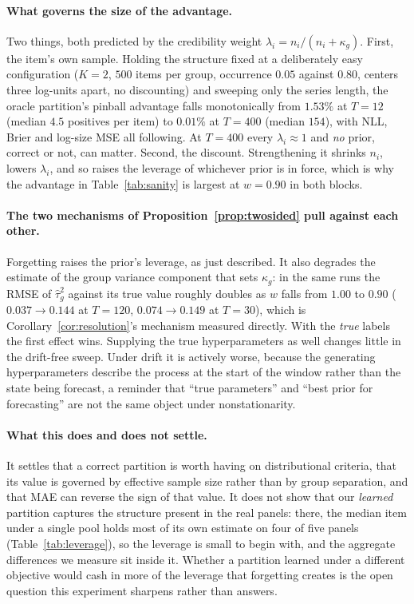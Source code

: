 \documentclass[twocolumn,10pt]{article}
\begin{document}
\paragraph{What governs the size of the advantage.} Two things, both
predicted by the credibility weight $\lambda_i=n_i/(n_i+\kappa_g)$.
First, the item's own sample. Holding the structure fixed at a
deliberately easy configuration ($K{=}2$, $500$ items per group,
occurrence $0.05$ against $0.80$, centers three log-units apart, no
discounting) and sweeping only the series length, the oracle partition's
pinball advantage falls monotonically from $1.53\%$ at $T{=}12$ (median
$4.5$ positives per item) to $0.01\%$ at $T{=}400$ (median $154$), with
NLL, Brier and log-size MSE all following. At $T{=}400$ every
$\lambda_i\approx1$ and \emph{no} prior, correct or not, can matter.
Second, the discount. Strengthening it shrinks $n_i$, lowers
$\lambda_i$, and so raises the leverage of whichever prior is in
force, which is why the advantage in Table~\ref{tab:sanity} is largest
at $w{=}0.90$ in both blocks.

\paragraph{The two mechanisms of Proposition~\ref{prop:twosided} pull
against each other.} Forgetting raises the prior's leverage, as just
described. It also degrades the estimate of the group variance component
that sets $\kappa_g$: in the same runs the RMSE of $\hat\tau_g^2$ against
its true value roughly doubles as $w$ falls from $1.00$ to $0.90$
($0.037\to0.144$ at $T{=}120$, $0.074\to0.149$ at $T{=}30$), which is
Corollary~\ref{cor:resolution}'s mechanism measured directly. With the
\emph{true} labels the first effect wins. Supplying the true
hyperparameters as well changes little in the drift-free sweep. Under
drift it is actively worse, because the generating hyperparameters
describe the process at the start of the window rather than the state
being forecast, a reminder that ``true parameters'' and ``best prior
for forecasting'' are not the same object under nonstationarity.

\paragraph{What this does and does not settle.} It settles that a correct
partition is worth having on distributional criteria, that its value is
governed by effective sample size rather than by group separation, and
that MAE can reverse the sign of that value. It does not show that our
\emph{learned} partition captures the structure present in the real
panels: there, the median item under a single pool holds most of its own
estimate on four of five panels (Table~\ref{tab:leverage}), so the
leverage is small to begin with, and the aggregate differences we
measure sit inside it. Whether a partition learned under a different
objective would cash in more of the leverage that forgetting creates is
the open question this experiment sharpens rather than answers.
\end{document}
